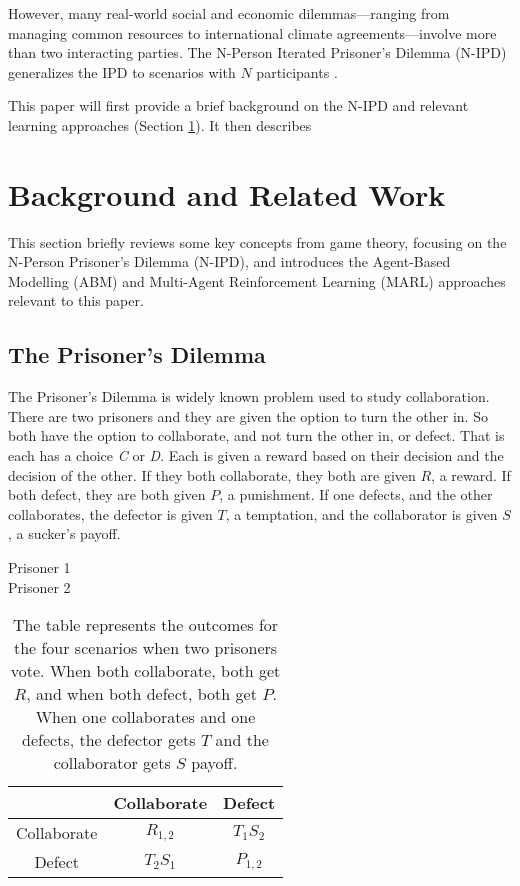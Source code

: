 \documentclass[]{llncs} %
\begin{document}
However, many real-world social and economic dilemmas—ranging from
managing common resources to international climate agreements—involve
more than two interacting parties. The N-Person Iterated Prisoner's
Dilemma (N-IPD) generalizes the IPD to scenarios with $N$ participants
\cite{Hamburger1973,Hardin1971}.


This paper will first provide a brief background on the N-IPD and
relevant learning approaches (Section \ref{sec:background}). It then
describes

\section{Background and Related Work}
\label{sec:background} 

This section briefly reviews some key concepts from game theory, focusing on the
N-Person Prisoner's Dilemma (N-IPD), and introduces the Agent-Based Modelling
(ABM) and Multi-Agent Reinforcement Learning (MARL) approaches relevant to this
paper. 

\subsection{The Prisoner's Dilemma}
The Prisoner's Dilemma \cite {Scodel,Axelrod} is widely
known problem used to study collaboration.  There are two prisoners
and they are given the option to turn the other in.  So both have
the option to collaborate, and not turn the other in, or defect.
That is each has a choice {\it C} or {\it D}.  Each is given a reward
based on their decision and the decision of the other.  If they both
collaborate, they both are given $R$, a reward.  If both defect, they
are both given $P$, a punishment.  If one defects, and the other collaborates,
the defector is given $T$, a temptation, and the collaborator is given
$S$, a sucker's payoff.  

\begin {table} [ht]
\begin{center}
  Prisoner 1 \\
    Prisoner 2
  \begin {tabular}{c | c | c |}
& Collaborate &  Defect \\
\hline
Collaborate& $R_{1,2}$ &  $T_1 S_2$ \\
\hline
Defect& $T_2 S_1$ &  $P_{1,2}$ \\
\hline
\end {tabular}
\caption {The table represents the outcomes for the four scenarios when
  two prisoners vote.  When both collaborate, both get $R$, and when
  both defect, both get $P$.  When one collaborates and one defects,
  the defector gets $T$ and the collaborator gets $S$ payoff.}
\label {tabPayoff}
\end {center}
\end {table}
\end{document}
